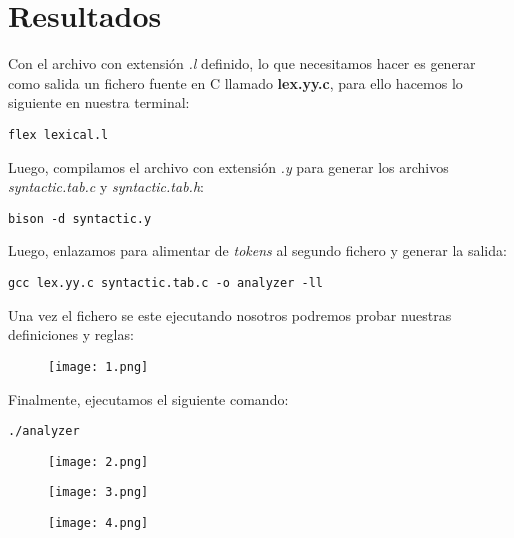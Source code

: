 \section{Resultados}

Con el archivo con extensión \textit{.l} definido, lo que necesitamos hacer es generar como salida un fichero fuente en C llamado \textbf{lex.yy.c}, para ello hacemos lo siguiente en nuestra terminal:

\begin{lstlisting}
flex lexical.l
\end{lstlisting}

Luego, compilamos el archivo con extensión \textit{.y} para generar los archivos \textit{syntactic.tab.c} y \textit{syntactic.tab.h}:

\begin{lstlisting}
bison -d syntactic.y
\end{lstlisting}

Luego, enlazamos para alimentar de \textit{tokens} al segundo fichero y generar la salida:

\begin{lstlisting}
gcc lex.yy.c syntactic.tab.c -o analyzer -ll
\end{lstlisting}

Una vez el fichero se este ejecutando nosotros podremos probar nuestras definiciones y reglas:

\begin{figure}[H]
\texttt{[image: 1.png]}
\centering \linebreak {}
\end{figure} 

Finalmente, ejecutamos el siguiente comando:

\begin{lstlisting}
./analyzer
\end{lstlisting}

\begin{figure}[H]
\texttt{[image: 2.png]}
\centering \linebreak {}
\end{figure} 

\begin{figure}[H]
\texttt{[image: 3.png]}
\centering \linebreak {}
\end{figure} 

\begin{figure}[H]
\texttt{[image: 4.png]}
\centering \linebreak {}
\end{figure} 

\pagebreak